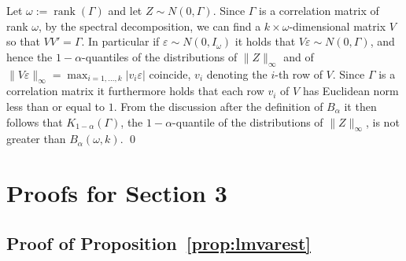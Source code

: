 \documentclass[preprint]{imsart}
\newcommand{\eps}{\varepsilon}
\DeclareMathOperator{\rank}{rank}
\numberwithin{equation}{section}
\begin{document}
Let $\omega := \rank(\Gamma)$ and let $Z \sim N(0, \Gamma)$. Since $\Gamma$ is a correlation matrix of rank $\omega$, by the spectral decomposition, we can find a $k \times \omega$-dimensional matrix $V$ so that $VV' = \Gamma$. In particular if $\eps \sim N(0, I_{\omega})$ it holds that $V \eps \sim N(0, \Gamma)$, and hence the $1-\alpha$-quantiles of the distributions of $\|Z\|_{\infty}$ and of $\| V\eps\|_{\infty} = \max_{i = 1, \hdots, k } |v_i \eps |$ coincide, $v_i$ denoting the $i$-th row of $V$. Since $\Gamma$ is a correlation matrix it furthermore holds that each row $v_i$ of $V$ has Euclidean norm less than or equal to $1$. From the discussion after the definition of $B_{\alpha}$ it then follows that $K_{1-\alpha}(\Gamma)$, the $1-\alpha$-quantile of the distributions of $\|Z\|_{\infty}$, is not greater than $B_{\alpha}(\omega, k)$. \hfill\qed





\section{Proofs for Section 3}
\label{app:appl}

\subsection{Proof of Proposition~\ref{prop:lmvarest}}
\label{sec:lmvarest}
\end{document}
